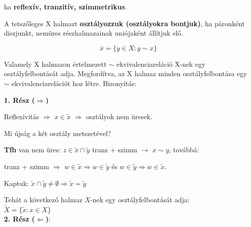\documentclass{beamer}
\newcommand{\msmallskip}{\vspace{0.3em}}
\newcommand{\mmedskip}{\vspace{0.5em}}
\begin{document}
\begin{frame}
\begin{tcolorbox}[title={Def.: Ekvivalenciareláció}]
ha \textbf{reflexív, tranzitív, szimmetrikus}.
\end{tcolorbox}

\begin{tcolorbox}[title={Def.: Halmaz osztályfelbontása}]
A tetszőleges X halmazt \textbf{osztályozzuk (osztályokra bontjuk)}, ha páronként diszjunkt, nemüres részhalmazainak uniójaként állítjuk elő.
\end{tcolorbox}

\begin{tcolorbox}[title={Az X $\in$ X elem \textbf{ekvivalencia osztálya}:}]
$$\overline{x} = \{y \in X : y \sim x\}$$
\end{tcolorbox}

\begin{tcolorbox}[title={Tétel: Ekvivalenciareláció és osztályfelbontás kapcsolata}]
Valamely X halmazon értelmezett $\sim$ ekvivalenciareláció X-nek egy osztályfelbontását adja. Megfordítva, az X halmaz minden osztályfelbontása egy $\sim$ ekvivalenciarelációt hoz létre.
\tcblower
Bizonyítás:\\
\mmedskip

\textbf{1. Rész ($\Rightarrow$)}\\
\mmedskip

Reflexivitás $\Rightarrow$ $x \in \tilde{x}$ $\Rightarrow$ osztályok nem üresek.\\
\msmallskip

Mi újság a két osztály metszetével?\\
\msmallskip

\textbf{Tfh} van nem üres: $z \in \tilde{x} \cap \tilde{y}$ tranz + szimm $\rightarrow$ $x \sim y$, továbbá:\\
\msmallskip

tranz + szimm $\Rightarrow$ $w \in \tilde{x} \Rightarrow w \in \tilde{y}$ és $w \in \tilde{y} \Rightarrow w \in \tilde{x}$.
\msmallskip

Kaptuk: $\tilde{x} \cap \tilde{y} \neq \emptyset \Rightarrow \tilde{x} = \tilde{y}$
\mmedskip

Tehát a következő halmaz $X$-nek egy osztályfelbontását adja:\\
$\tilde{X} = \{ \tilde{x} : x \in X \}$\\

\textbf{2. Rész ($\Leftarrow$)}:\\
\mmedskip


\end{tcolorbox}
\end{frame}
\end{document}
